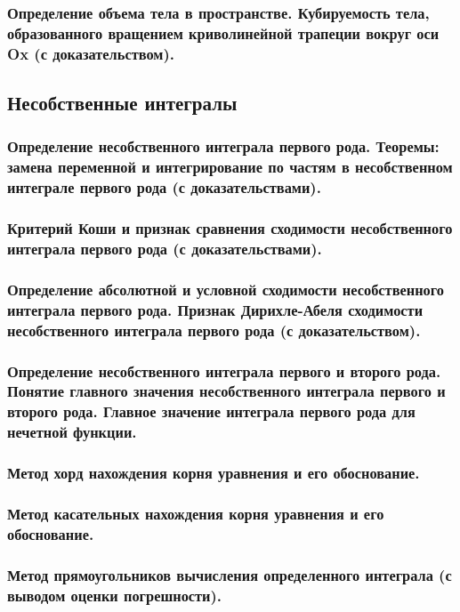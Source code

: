\documentclass[10pt]{article}
\begin{document}
    \subsubsection{Определение объема тела в пространстве. Кубируемость тела, образованного вращением криволинейной трапеции вокруг оси Ox (с доказательством).}
    \subsection{Несобственные интегралы}
    \subsubsection{Определение несобственного интеграла первого рода. Теоремы: замена переменной и интегрирование по частям в несобственном интеграле первого рода (с доказательствами).}
    \subsubsection{Критерий Коши и признак сравнения сходимости несобственного интеграла первого рода (с доказательствами).}
    \subsubsection{Определение абсолютной и условной сходимости несобственного интеграла первого рода. Признак Дирихле-Абеля сходимости несобственного интеграла первого рода (с доказательством).}
    \subsubsection{Определение несобственного интеграла первого и второго рода. Понятие главного значения несобственного интеграла первого и второго рода. Главное значение интеграла первого рода для нечетной функции.}
    \subsubsection{Метод хорд нахождения корня уравнения и его обоснование.}
    \subsubsection{Метод касательных нахождения корня уравнения и его обоснование.}
    \subsubsection{Метод прямоугольников вычисления определенного интеграла (с выводом оценки погрешности).}
\end{document}
